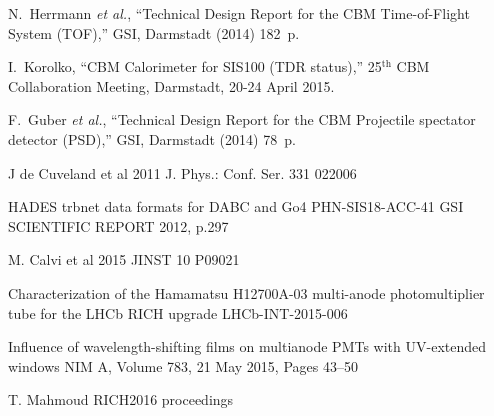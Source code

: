\begin{thebibliography}{99}
N.~Herrmann {\it et al.}, ``Technical Design Report for the CBM Time-of-Flight System (TOF),'' GSI, Darmstadt (2014) 182~p.

I.~Korolko, ``CBM Calorimeter for SIS100 (TDR status),'' 25$^\mathrm{th}$ CBM Collaboration Meeting, Darmstadt, 20-24 April 2015.\\

F.~Guber {\it et al.}, ``Technical Design Report for the CBM Projectile spectator detector (PSD),'' GSI, Darmstadt (2014) 78~p.



J de Cuveland et al 2011 J. Phys.: Conf. Ser. 331 022006

HADES trbnet data formats for DABC and Go4
PHN-SIS18-ACC-41
GSI SCIENTIFIC REPORT 2012, p.297


M. Calvi et al 2015 JINST 10 P09021 

Characterization of the Hamamatsu H12700A-03 multi-anode photomultiplier tube for the LHCb RICH upgrade
LHCb-INT-2015-006


Influence of wavelength-shifting films on multianode PMTs with UV-extended windows
NIM A, Volume 783, 21 May 2015, Pages 43–50

T. Mahmoud RICH2016 proceedings


\end{thebibliography}
